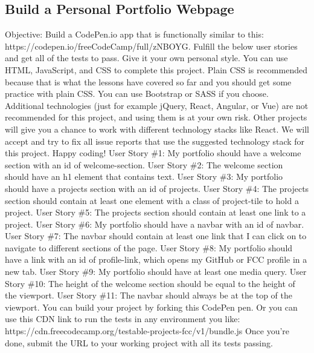 \documentclass{article}%
\begin{document}
\subsection{Build a Personal Portfolio Webpage}%
\label{subsec:BuildaPersonalPortfolioWebpage}%
Objective: Build a CodePen.io app that is functionally similar to this: https://codepen.io/freeCodeCamp/full/zNBOYG.\newline%
Fulfill the below user stories and get all of the tests to pass. Give it your own personal style.\newline%
You can use HTML, JavaScript, and CSS to complete this project. Plain CSS is recommended because that is what the lessons have covered so far and you should get some practice with plain CSS. You can use Bootstrap or SASS if you choose. Additional technologies (just for example jQuery, React, Angular, or Vue) are not recommended for this project, and using them is at your own risk. Other projects will give you a chance to work with different technology stacks like React. We will accept and try to fix all issue reports that use the suggested technology stack for this project. Happy coding!\newline%
User Story \#1: My portfolio should have a welcome section with an id of welcome{-}section.\newline%
User Story \#2: The welcome section should have an h1 element that contains text.\newline%
User Story \#3: My portfolio should have a projects section with an id of projects.\newline%
User Story \#4: The projects section should contain at least one element with a class of project{-}tile to hold a project.\newline%
User Story \#5: The projects section should contain at least one link to a project.\newline%
User Story \#6: My portfolio should have a navbar with an id of navbar.\newline%
User Story \#7: The navbar should contain at least one link that I can click on to navigate to different sections of the page.\newline%
User Story \#8: My portfolio should have a link with an id of profile{-}link, which opens my GitHub or FCC profile in a new tab.\newline%
User Story \#9: My portfolio should have at least one media query.\newline%
User Story \#10: The height of the welcome section should be equal to the height of the viewport.\newline%
User Story \#11: The navbar should always be at the top of the viewport.\newline%
You can build your project by forking this CodePen pen. Or you can use this CDN link to run the tests in any environment you like: https://cdn.freecodecamp.org/testable{-}projects{-}fcc/v1/bundle.js\newline%
Once you're done, submit the URL to your working project with all its tests passing.\newline%

%
\newpage%
\end{document}
